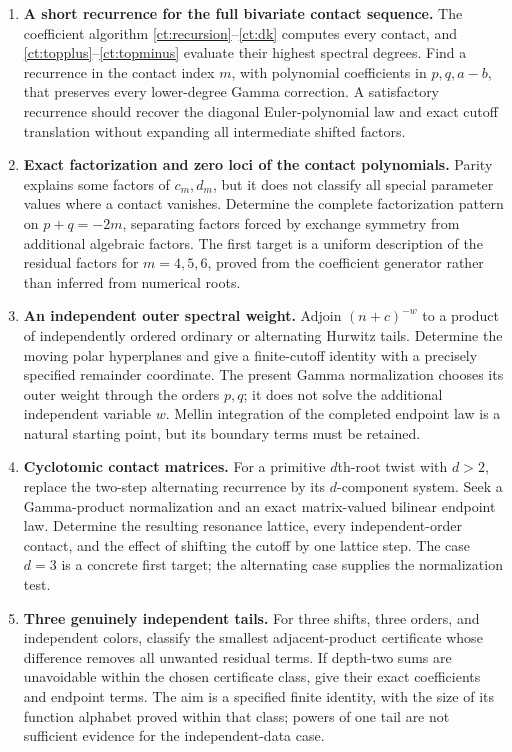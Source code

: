 \documentclass[11pt,letterpaper]{article}
\numberwithin{equation}{section}
\theoremstyle{definition}
\theoremstyle{remark}
\begin{document}
\begin{enumerate}[label=\textbf{Q\arabic*.}]
\item \textbf{A short recurrence for the full bivariate contact sequence.}
The coefficient algorithm \eqref{ct:recursion}--\eqref{ct:dk} computes every
contact, and \eqref{ct:topplus}--\eqref{ct:topminus} evaluate their highest
spectral degrees. Find a recurrence in the contact index \(m\), with
polynomial coefficients in \(p,q,a-b\), that preserves every lower-degree
Gamma correction. A satisfactory recurrence should recover the diagonal
Euler-polynomial law and exact cutoff translation without expanding all
intermediate shifted factors.

\item \textbf{Exact factorization and zero loci of the contact polynomials.}
Parity explains some factors of \(c_m,d_m\), but it does not classify all
special parameter values where a contact vanishes. Determine the complete
factorization pattern on \(p+q=-2m\), separating factors forced by exchange
symmetry from additional algebraic factors. The first target is a uniform
description of the residual factors for \(m=4,5,6\), proved from the
coefficient generator rather than inferred from numerical roots.

\item \textbf{An independent outer spectral weight.}
Adjoin \((n+c)^{-w}\) to a product of independently ordered ordinary or
alternating Hurwitz tails. Determine the moving polar hyperplanes and give
a finite-cutoff identity with a precisely specified remainder coordinate.
The present Gamma normalization chooses its outer weight through the
orders \(p,q\); it does not solve the additional independent variable
\(w\). Mellin integration of the completed endpoint law is a natural
starting point, but its boundary terms must be retained.

\item \textbf{Cyclotomic contact matrices.}
For a primitive \(d\)th-root twist with \(d>2\), replace the two-step
alternating recurrence by its \(d\)-component system. Seek a Gamma-product
normalization and an exact matrix-valued bilinear endpoint law. Determine
the resulting resonance lattice, every independent-order contact, and the
effect of shifting the cutoff by one lattice step. The case \(d=3\) is a
concrete first target; the alternating case supplies the normalization test.

\item \textbf{Three genuinely independent tails.}
For three shifts, three orders, and independent colors, classify the
smallest adjacent-product certificate whose difference removes all
unwanted residual terms. If depth-two sums are unavoidable within the
chosen certificate class, give their exact coefficients and endpoint
terms. The aim is a specified finite identity, with the size of its
function alphabet proved within that class; powers of one tail are not
sufficient evidence for the independent-data case.


\end{enumerate}
\end{document}
